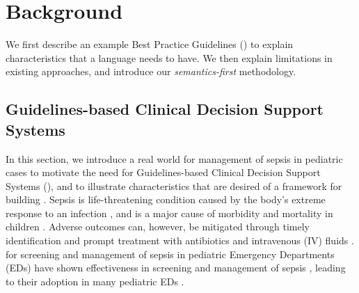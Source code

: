 \section{Background}

We first describe an example Best Practice Guidelines (\BPG{}) to
explain characteristics that a \CIG{} language needs to have. We then
explain limitations in existing approaches, and introduce our
\emph{semantics-first} methodology.

\subsection{Guidelines-based Clinical Decision Support Systems}

In this section, we introduce a real world \BPG{} for management of sepsis
in pediatric cases to motivate the need for Guidelines-based Clinical Decision Support Systems (\CDSSs{}),
and to illustrate characteristics that are desired of a framework for building
\CDSSs{}.
Sepsis is life-threatening condition caused by the body's extreme response to
an infection \cite{RhodesICM17}, and is
a major cause of morbidity and mortality in children \cite{Eisenberg2021JP}.
Adverse outcomes can, however, be mitigated through timely
identification and prompt treatment with antibiotics and
intravenous (IV) fluids \cite{Weiss2014CCM,Evans2018JAMA}.
\BPGs{} for screening and management of sepsis in pediatric Emergency
Departments (EDs) have shown effectiveness in screening and management of sepsis \cite{Eisenberg2021JP},
leading to their adoption in many pediatric EDs \cite{Balamuth2017EM,Sepanski2014FP}.

